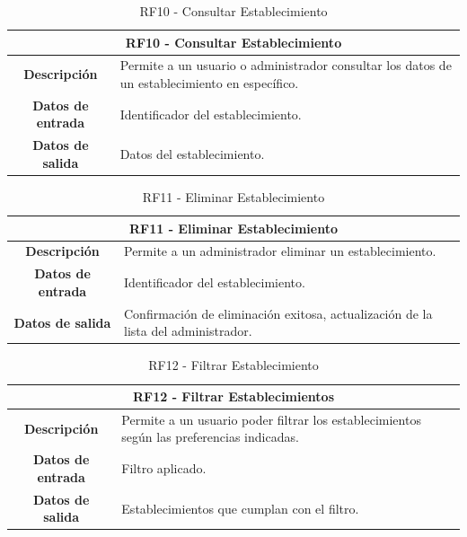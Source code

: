 \begin{table}[H]
    \centering
    \begin{tabular}{|c|p{10cm}|}
        \hline
        \multicolumn{2}{|c|}{\textbf{RF10 - Consultar Establecimiento}}                                                           \\
        \hline
        \textbf{Descripción}      & Permite a un usuario o administrador consultar los datos de un establecimiento en específico. \\
        \hline
        \textbf{Datos de entrada} & Identificador del establecimiento.                                                            \\
        \hline
        \textbf{Datos de salida}  & Datos del establecimiento.                                                                    \\
        \hline
    \end{tabular}
    \caption{RF10 - Consultar Establecimiento}
\end{table}

\begin{table}[H]
    \centering
    \begin{tabular}{|c|p{10cm}|}
        \hline
        \multicolumn{2}{|c|}{\textbf{RF11 - Eliminar Establecimiento}}                                                \\
        \hline
        \textbf{Descripción}      & Permite a un administrador eliminar un establecimiento.                           \\
        \hline
        \textbf{Datos de entrada} & Identificador del establecimiento.                                                \\
        \hline
        \textbf{Datos de salida}  & Confirmación de eliminación exitosa, actualización de la lista del administrador. \\
        \hline
    \end{tabular}
    \caption{RF11 - Eliminar Establecimiento}
\end{table}

\begin{table}[H]
    \centering
    \begin{tabular}{|c|p{10cm}|}
        \hline
        \multicolumn{2}{|c|}{\textbf{RF12 - Filtrar Establecimientos}}                                                        \\
        \hline
        \textbf{Descripción}      & Permite a un usuario poder filtrar los establecimientos según las preferencias indicadas. \\
        \hline
        \textbf{Datos de entrada} & Filtro aplicado.                                                                          \\
        \hline
        \textbf{Datos de salida}  & Establecimientos que cumplan con el filtro.                                               \\
        \hline
    \end{tabular}
    \caption{RF12 - Filtrar Establecimiento}
\end{table}

